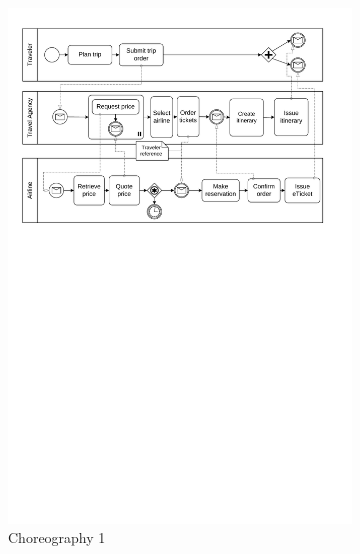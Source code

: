 \begin{figure}
  \hfill
  \begin{subfigure}{.3\textwidth}
    \includegraphics[width=\textwidth]{figures/choreography.pdf}
    \caption{Choreography 1}
    \label{fig:subfigA}
  \end{subfigure}
  \hfill
  \begin{subfigure}{.3\textwidth}

\end{subfigure}
\end{figure}
